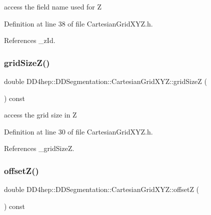 access the field name used for Z 



Definition at line 38 of file Cartesian\+Grid\+X\+Y\+Z.\+h.



References \+\_\+z\+Id.

\hypertarget{class_d_d4hep_1_1_d_d_segmentation_1_1_cartesian_grid_x_y_z_ab1f1df187bae769c14fe5df39c257cc6}{}\label{class_d_d4hep_1_1_d_d_segmentation_1_1_cartesian_grid_x_y_z_ab1f1df187bae769c14fe5df39c257cc6} 
\subsubsection{\texorpdfstring{grid\+Size\+Z()}{gridSizeZ()}}
{\footnotesize\ttfamily double D\+D4hep\+::\+D\+D\+Segmentation\+::\+Cartesian\+Grid\+X\+Y\+Z\+::grid\+SizeZ (\begin{DoxyParamCaption}{ }\end{DoxyParamCaption}) const\hspace{0.3cm}{\ttfamily [inline]}}



access the grid size in Z 



Definition at line 30 of file Cartesian\+Grid\+X\+Y\+Z.\+h.



References \+\_\+grid\+SizeZ.

\hypertarget{class_d_d4hep_1_1_d_d_segmentation_1_1_cartesian_grid_x_y_z_a6ee56704366352e0982d33dd349eede1}{}\label{class_d_d4hep_1_1_d_d_segmentation_1_1_cartesian_grid_x_y_z_a6ee56704366352e0982d33dd349eede1} 
\subsubsection{\texorpdfstring{offset\+Z()}{offsetZ()}}
{\footnotesize\ttfamily double D\+D4hep\+::\+D\+D\+Segmentation\+::\+Cartesian\+Grid\+X\+Y\+Z\+::offsetZ (\begin{DoxyParamCaption}{ }\end{DoxyParamCaption}) const\hspace{0.3cm}{\ttfamily [inline]}}



